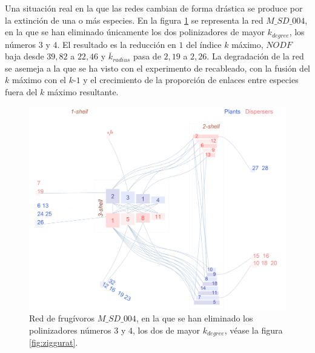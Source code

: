 Una situación real en la que las redes cambian de forma drástica se produce por la extinción de una o más especies. En la figura \ref{fig:VIS_M_SD_004_pol3_pol4_ziggurat} se representa la red $M\_SD\_004$, en la que se han eliminado únicamente los dos polinizadores de mayor $k_{degree}$, los números $3$ y $4$. El resultado es la reducción en $1$ del índice $k$ máximo, $NODF$ baja desde $39,82$ a $22,46$ y $\overline k_{radius}$ pasa de $2,19$ a $2,26$. La degradación de la red se asemeja a la que se ha visto con el experimento de recableado, con la fusión del $k$ máximo con el $k$-$1$ y el crecimiento de la proporción de enlaces entre especies fuera del $k$ máximo resultante.

\begin{figure}[ht!]
\centering
\includegraphics[scale=0.5]{Figures/VIS_M_SD_004_pol3_pol4_ziggurat.png}
\caption {Red de frugívoros $M\_SD\_004$, en la que se han eliminado los polinizadores números $3$ y $4$, los dos de mayor $k_{degree}$, véase la figura \ref{fig:ziggurat}.} 
\label{fig:VIS_M_SD_004_pol3_pol4_ziggurat}
\end{figure}

